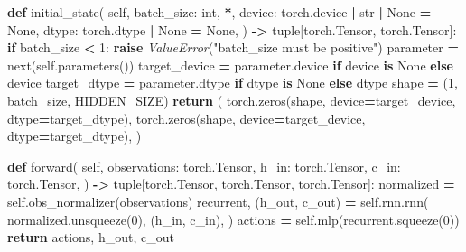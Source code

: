 \documentclass[
  american,
  11pt,
  letterpaper,
]{article}
\newenvironment{Shaded}{\begin{snugshade}}{\end{snugshade}}
\newcommand{\BuiltInTok}[1]{#1}
\newcommand{\ControlFlowTok}[1]{\textcolor[rgb]{0.13,0.29,0.53}{\textbf{#1}}}
\newcommand{\DecValTok}[1]{\textcolor[rgb]{0.00,0.00,0.81}{#1}}
\newcommand{\KeywordTok}[1]{\textcolor[rgb]{0.13,0.29,0.53}{\textbf{#1}}}
\newcommand{\NormalTok}[1]{#1}
\newcommand{\OperatorTok}[1]{\textcolor[rgb]{0.81,0.36,0.00}{\textbf{#1}}}
\newcommand{\PreprocessorTok}[1]{\textcolor[rgb]{0.56,0.35,0.01}{\textit{#1}}}
\newcommand{\StringTok}[1]{\textcolor[rgb]{0.31,0.60,0.02}{#1}}
\newcommand{\VariableTok}[1]{\textcolor[rgb]{0.00,0.00,0.00}{#1}}
\renewenvironment{Shaded}{\par\smallskip}{\par\smallskip}
\begin{document}
\begin{Shaded}
\begin{Highlighting}[]
    \KeywordTok{def}\NormalTok{ initial\_state(}
        \VariableTok{self}\NormalTok{,}
\NormalTok{        batch\_size: }\BuiltInTok{int}\NormalTok{,}
        \OperatorTok{*}\NormalTok{,}
\NormalTok{        device: torch.device }\OperatorTok{|} \BuiltInTok{str} \OperatorTok{|} \VariableTok{None} \OperatorTok{=} \VariableTok{None}\NormalTok{,}
\NormalTok{        dtype: torch.dtype }\OperatorTok{|} \VariableTok{None} \OperatorTok{=} \VariableTok{None}\NormalTok{,}
\NormalTok{    ) }\OperatorTok{{-}\textgreater{}} \BuiltInTok{tuple}\NormalTok{[torch.Tensor, torch.Tensor]:}
        \ControlFlowTok{if}\NormalTok{ batch\_size }\OperatorTok{\textless{}} \DecValTok{1}\NormalTok{:}
            \ControlFlowTok{raise} \PreprocessorTok{ValueError}\NormalTok{(}\StringTok{"batch\_size must be positive"}\NormalTok{)}
\NormalTok{        parameter }\OperatorTok{=} \BuiltInTok{next}\NormalTok{(}\VariableTok{self}\NormalTok{.parameters())}
\NormalTok{        target\_device }\OperatorTok{=}\NormalTok{ parameter.device }\ControlFlowTok{if}\NormalTok{ device }\KeywordTok{is} \VariableTok{None} \ControlFlowTok{else}\NormalTok{ device}
\NormalTok{        target\_dtype }\OperatorTok{=}\NormalTok{ parameter.dtype }\ControlFlowTok{if}\NormalTok{ dtype }\KeywordTok{is} \VariableTok{None} \ControlFlowTok{else}\NormalTok{ dtype}
\NormalTok{        shape }\OperatorTok{=}\NormalTok{ (}\DecValTok{1}\NormalTok{, batch\_size, HIDDEN\_SIZE)}
        \ControlFlowTok{return}\NormalTok{ (}
\NormalTok{            torch.zeros(shape, device}\OperatorTok{=}\NormalTok{target\_device, dtype}\OperatorTok{=}\NormalTok{target\_dtype),}
\NormalTok{            torch.zeros(shape, device}\OperatorTok{=}\NormalTok{target\_device, dtype}\OperatorTok{=}\NormalTok{target\_dtype),}
\NormalTok{        )}

    \KeywordTok{def}\NormalTok{ forward(}
        \VariableTok{self}\NormalTok{,}
\NormalTok{        observations: torch.Tensor,}
\NormalTok{        h\_in: torch.Tensor,}
\NormalTok{        c\_in: torch.Tensor,}
\NormalTok{    ) }\OperatorTok{{-}\textgreater{}} \BuiltInTok{tuple}\NormalTok{[torch.Tensor, torch.Tensor, torch.Tensor]:}
\NormalTok{        normalized }\OperatorTok{=} \VariableTok{self}\NormalTok{.obs\_normalizer(observations)}
\NormalTok{        recurrent, (h\_out, c\_out) }\OperatorTok{=} \VariableTok{self}\NormalTok{.rnn.rnn(}
\NormalTok{            normalized.unsqueeze(}\DecValTok{0}\NormalTok{),}
\NormalTok{            (h\_in, c\_in),}
\NormalTok{        )}
\NormalTok{        actions }\OperatorTok{=} \VariableTok{self}\NormalTok{.mlp(recurrent.squeeze(}\DecValTok{0}\NormalTok{))}
        \ControlFlowTok{return}\NormalTok{ actions, h\_out, c\_out}


\end{Highlighting}
\end{Shaded}
\end{document}
